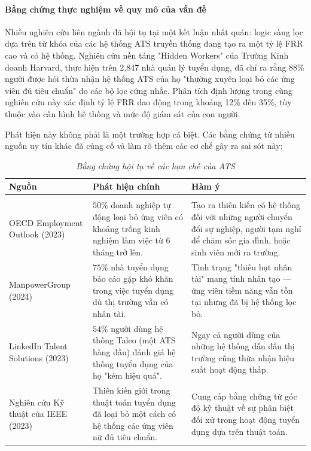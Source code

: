 \documentclass{article}
\begin{document}
\paragraph{Bằng chứng thực nghiệm về quy mô của vấn đề}
Nhiều nghiên cứu liên ngành đã hội tụ tại một kết luận nhất quán: logic sàng lọc dựa trên từ khóa của các hệ thống ATS truyền thống đang tạo ra một tỷ lệ FRR cao và có hệ thống. Nghiên cứu nền tảng "Hidden Workers" của Trường Kinh doanh Harvard, thực hiện trên 2,847 nhà quản lý tuyển dụng, đã chỉ ra rằng 88\% người được hỏi thừa nhận hệ thống ATS của họ "thường xuyên loại bỏ các ứng viên đủ tiêu chuẩn" do các bộ lọc cứng nhắc. Phân tích định lượng trong cùng nghiên cứu này xác định tỷ lệ FRR dao động trong khoảng 12\% đến 35\%, tùy thuộc vào cấu hình hệ thống và mức độ giám sát của con người.

Phát hiện này không phải là một trường hợp cá biệt. Các bằng chứng từ nhiều nguồn uy tín khác đã củng cố và làm rõ thêm các cơ chế gây ra sai sót này:
\begin{longtable}{|
  >{\raggedright\arraybackslash}p{}|
  >{\raggedright\arraybackslash}p{}|
  >{\raggedright\arraybackslash}p{}|}
  \hline
  \textbf{Nguồn} &
  \textbf{Phát hiện chính} &
  \textbf{Hàm ý} \\
  \hline
  \endfirsthead

  \endhead

  \hline
  \endfoot

  \hline
  \caption{\textit{Bằng chứng hội tụ về các hạn chế của ATS}} \\
  \endlastfoot

  OECD Employment Outlook (2023) &
  $50\%$ doanh nghiệp tự động loại bỏ ứng viên có khoảng trống kinh nghiệm làm việc từ 6 tháng trở lên. &
  Tạo ra thiên kiến có hệ thống đối với những người chuyển đổi sự nghiệp, người tạm nghỉ để chăm sóc gia đình, hoặc sinh viên mới ra trường. \\
  \hline

  ManpowerGroup (2024) &
  $75\%$ nhà tuyển dụng báo cáo gặp khó khăn trong việc tuyển dụng dù thị trường vẫn có nhân tài. &
  Tình trạng "thiếu hụt nhân tài" mang tính nhân tạo — ứng viên tiềm năng vẫn tồn tại nhưng đã bị hệ thống lọc bỏ. \\
  \hline

  LinkedIn Talent Solutions (2023) &
  $54\%$ người dùng hệ thống Taleo (một ATS hàng đầu) đánh giá hệ thống tuyển dụng của họ "kém hiệu quả". &
  Ngay cả người dùng của những hệ thống dẫn đầu thị trường cũng thừa nhận hiệu suất hoạt động thấp. \\
  \hline

  Nghiên cứu Kỹ thuật của IEEE (2023) &
  Thiên kiến giới trong thuật toán tuyển dụng đã loại bỏ một cách có hệ thống các ứng viên nữ đủ tiêu chuẩn. &
  Cung cấp bằng chứng từ góc độ kỹ thuật về sự phân biệt đối xử trong hoạt động tuyển dụng dựa trên thuật toán. \\
  \hline
\end{longtable}
\end{document}
